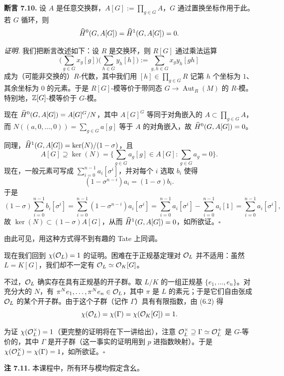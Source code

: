 \textbf{断言 7.10.} 设 $A$ 是任意交换群，$A[G]:=\prod_{g\in G}A$，$G$ 通过置换坐标作用于此。若 $G$ 循环，则
\[
\widehat{H}^0(G,A[G])=\widehat{H}^1(G,A[G])=0 .
\]

\textit{证明.} 我们把断言改述如下：设 $R$ 是交换环，则 $R[G]$ 通过乘法运算
\[
\Big(\sum_{g\in G}x_g[g]\Big)\Big(\sum_{h\in G}y_h[h]\Big):=\sum_{g,h\in G}x_gy_h[gh]
\]
成为（可能非交换的）$R$-代数，其中我们用 $[h]\in\prod_{g\in G}R$ 记第 $h$ 个坐标为 $1$、其余坐标为 $0$ 的元素。于是 $R[G]$-模等价于带同态 $G\to\operatorname{Aut}_R(M)$ 的 $R$-模。特别地，$\mathbb{Z}[G]$-模等价于 $G$-模。

现在 $\widehat{H}^0(G,A[G])=A[G]^G/N$，其中 $A[G]^G$ 等同于对角嵌入的 $A\subset\prod_{g\in G}A$，而 $N((a,0,\dots,0))=\sum_{g\in G}a[g]$ 等于 $A$ 的对角嵌入，故 $\widehat{H}^0(G,A[G])=0$。

同理，$\widehat{H}^1(G,A[G])=\ker(N)/(1-\sigma)$，且
\[
A[G]\supseteq\ker(N)=\Big\{\sum_{g\in G}a_g[g]\in A[G]:\sum_{g\in G}a_g=0\Big\}.
\]
现在，一般元素可写成 $\sum_{i=0}^{n-1}a_i[\sigma^i]$，并对每个 $i$ 选取 $b_i$ 使得
\[
(1-\sigma^{n-i})a_i=(1-\sigma)b_i .
\]
于是
\[
(1-\sigma)\sum_{i=0}^{n-1}b_i[\sigma^i]
=\sum_{i=0}^{n-1}(1-\sigma^{n-i})a_i[\sigma^i]
=\sum_{i=0}^{n-1}a_i[\sigma^i]-\sum_{i=0}^{n-1}a_i[1]
=\sum_{i=0}^{n-1}a_i[\sigma^i],
\]
故 $\ker(N)\subset(1-\sigma)A[G]$，从而 $\widehat{H}^1(G,A[G])=0$，如所欲证。\hfill$\square$

由此可见，用这种方式得不到有趣的 Tate 上同调。

现在我们回到 $\chi(\mathcal{O}_L)=1$ 的证明。困难在于正规基定理对 $\mathcal{O}_L$ 并不适用：虽然 $L=K[G]$，我们却不一定有 $\mathcal{O}_L\simeq\mathcal{O}_K[G]$。

不过，$\mathcal{O}_L$ 确实存在具有正规基的开子群。取 $L/K$ 的一组正规基 $\{e_1,\dots,e_n\}$。对充分大的 $N$，有 $\pi^Ne_1,\dots,\pi^Ne_n\in\mathcal{O}_L$，其中 $\pi$ 是 $L$ 的素元；于是它们自由张成 $\mathcal{O}_L$ 的某个开子群。由于这个子群（记作 $\Gamma$）具有有限指数，由 (6.2) 得
\[
\chi(\mathcal{O}_L)=\chi(\Gamma)=\chi(\mathcal{O}_K[G])=1 .
\]

为证 $\chi(\mathcal{O}_L^\times)=1$（更完整的证明将在下一讲给出），注意 $\mathcal{O}_L^\times\supseteq\Gamma\simeq\mathcal{O}_L^+$ 是 $G$-等价的，其中 $\Gamma$ 是开子群（这一事实的证明用到 $p$ 进指数映射）。于是 $\chi(\mathcal{O}_L^\times)=\chi(\Gamma)=1$，如所欲证。\hfill$\square$

\textbf{注 7.11.} 本课程中，所有环与模均假定含幺。
